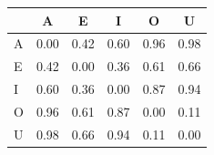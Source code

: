 \begin{tabular}{lccccc}
\toprule
\rowcolor{col01}
 & A & E & I & O & U \\
\midrule
A & 0.00 & 0.42 & 0.60 & 0.96 & 0.98 \\
E & 0.42 & 0.00 & 0.36 & 0.61 & 0.66 \\
I & 0.60 & 0.36 & 0.00 & 0.87 & 0.94 \\
O & 0.96 & 0.61 & 0.87 & 0.00 & 0.11 \\
U & 0.98 & 0.66 & 0.94 & 0.11 & 0.00 \\
\bottomrule
\end{tabular}
